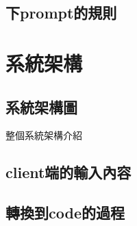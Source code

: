 \documentclass[class=NCU_thesis, crop=false]{standalone}
\begin{document}
\subsection{下prompt的規則}

\section{系統架構}
\subsection{系統架構圖}
整個系統架構介紹
\subsection{client端的輸入內容}
\subsection{轉換到code的過程}
\end{document}
